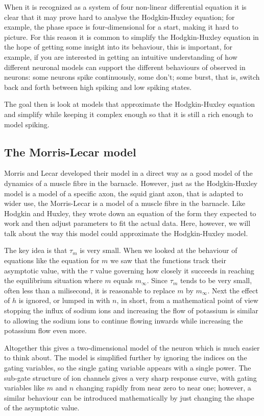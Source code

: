 \documentclass[12pt]{article}
\begin{document}
When it is recognized as a system of four non-linear differential
equation it is clear that it may prove hard to analyse the
Hodgkin-Huxley equation; for example, the phase space is
four-dimensional for a start, making it hard to picture. For this
reason it is common to simplify the Hodgkin-Huxley equation in the
hope of getting some insight into its behaviour, this is important,
for example, if you are interested in getting an intuitive
understanding of how different neuronal models can support the
different behaviours of observed in neurons: some neurons spike
continuously, some don't; some burst, that is, switch back and forth
between high spiking and low spiking states.

The goal then is look at models that approximate the Hodgkin-Huxley
equation and simplify while keeping it complex enough so that it is
still a rich enough to model spiking.

\subsection*{The Morris-Lecar model}


Morris and Lecar  \cite{MorrisLecar1981} developed their model in a direct way as a good model
of the dynamics of a muscle fibre in the barnacle.  However, just as
the Hodgkin-Huxley model is a model of a specific axon, the squid
giant axon, that is adapted to wider use, the Morris-Lecar is a model
of a muscle fibre in the barnacle. Like Hodgkin and Huxley, they wrote
down an equation of the form they expected to work and then adjust
parameters to fit the actual data. Here, however, we will talk about
the way this model could approximate the Hodgkin-Huxley model.

The key idea is that $\tau_m$ is very small. When we looked at the
behaviour of equations like the equation for $m$ we saw that the
functions track their asymptotic value, with the $\tau$ value
governing how closely it succeeds in reaching the equilibrium
situation where $m$ equals $m_\infty$. Since $\tau_m$ tends to be very
small, often less than a milisecond, it is reasonable to replace $m$
by $m_\infty$. Next the effect of $h$ is ignored, or lumped in with
$n$, in short, from a mathematical point of view stopping the influx
of sodium ions and increasing the flow of potassium is similar to
allowing the sodium ions to continue flowing inwards while increasing
the potassium flow even more.

Altogether this gives a two-dimensional model of the neuron which is
much easier to think about.  The model is simplified further by
ignoring the indices on the gating variables, so the single gating
variable appears with a single power. The sub-gate structure of ion
channels gives a very sharp response curve, with gating variables like
$m$ and $n$ changing rapidly from near zero to near one; however, a
similar behaviour can be introduced mathematically by just changing
the shape of the asymptotic value.
\end{document}
